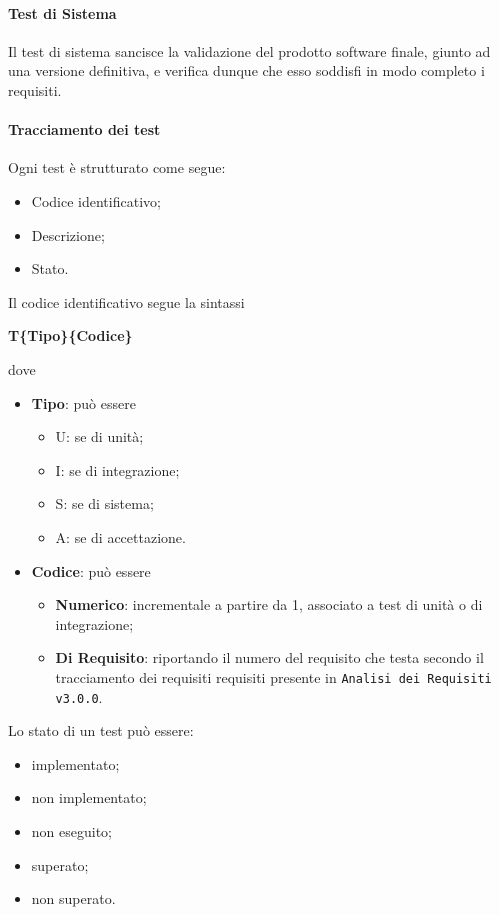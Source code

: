 \paragraph{Test di Sistema}
Il test di sistema sancisce la validazione del prodotto software finale, giunto ad una versione definitiva, e verifica dunque che esso soddisfi in modo completo i requisiti. 
\paragraph{Tracciamento dei test}
Ogni test è strutturato come segue:
\begin{itemize}
	\item Codice identificativo;
	\item Descrizione;
	\item Stato.
\end{itemize}
Il codice identificativo segue la sintassi 
\begin{center}
	\textbf{T\{Tipo\}\{Codice\}}
\end{center}
dove 
\begin{itemize}
	\item \textbf{Tipo}: può essere
		\begin{itemize}
			\item U: se di unità;
			\item I: se di integrazione;
			\item S: se di sistema;
			\item A: se di accettazione.
		\end{itemize}
	\item \textbf{Codice}: può essere
		\begin{itemize}
			\item \textbf{Numerico}: incrementale a partire da 1, associato a test di unità o di integrazione;
			\item \textbf{Di Requisito}: riportando il numero del requisito che testa secondo il tracciamento dei requisiti requisiti presente in \texttt{Analisi dei Requisiti v3.0.0}.
		\end{itemize}
\end{itemize}
	Lo stato di un test può essere:
\begin{itemize}
	\item implementato;
	\item non implementato;
	\item non eseguito;
	\item superato;
	\item non superato.
\end{itemize}
